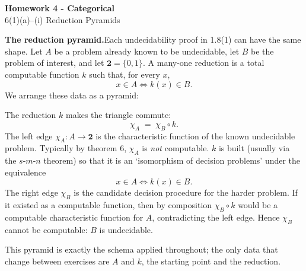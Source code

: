 \documentclass[fleqn]{article}
\begin{document}
\begin{center}
{\Large \textbf{Homework 4 - Categorical}}\\[0.5em]
{\large 6(1)(a)--(i) Reduction Pyramids}
\end{center}

\bigskip

\noindent\textbf{The reduction pyramid.}\quad Each undecidability proof in 1.8(1) can have the same shape. Let $A$ be a problem already known to be undecidable, let $B$ be the problem of interest, and let $\mathbf{2} = \{0, 1\}$. A many-one reduction is a total computable function $k$ such that, for every $x$,
\[
x \in A \iff k(x) \in B.
\]
We arrange these data as a pyramid:

\bigskip

\begin{center}
\end{center}

\bigskip

\noindent The reduction $k$ makes the triangle commute:
\[
\chi_A \;=\; \chi_B \circ k.
\]
The left edge $\chi_A \colon A \to \mathbf{2}$ is the characteristic function of the known undecidable problem. Typically by theorem 6, $\chi_A$ is \textit{not} computable. $k$ is built (usually via the $s$\nobreakdash-$m$\nobreakdash-$n$ theorem) so that it is an `isomorphism of decision problems' under the equivalence
\[
x \in A \iff k(x) \in B.
\]
The right edge $\chi_B$ is the candidate decision procedure for the harder problem. If it existed as a computable function, then by composition $\chi_B \circ k$ would be a computable characteristic function for $A$, contradicting the left edge. Hence $\chi_B$ cannot be computable: $B$ is undecidable.

This pyramid is exactly the schema applied throughout; the only data that change between exercises are $A$ and $k$, the starting point and the reduction.
\end{document}
